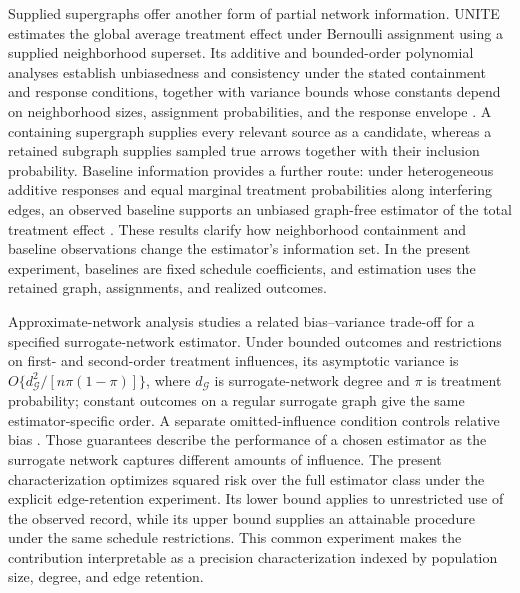 Supplied supergraphs offer another form of partial network information. UNITE estimates the global average treatment effect under Bernoulli assignment using a supplied neighborhood superset. Its additive and bounded-order polynomial analyses establish unbiasedness and consistency under the stated containment and response conditions, together with variance bounds whose constants depend on neighborhood sizes, assignment probabilities, and the response envelope \citep[Theorems 1, 4, and 8; Appendix B.1]{ShankarEtAl2024UNITE}. A containing supergraph supplies every relevant source as a candidate, whereas a retained subgraph supplies sampled true arrows together with their inclusion probability. Baseline information provides a further route: under heterogeneous additive responses and equal marginal treatment probabilities along interfering edges, an observed baseline supports an unbiased graph-free estimator of the total treatment effect \citep[Corollary 3]{YuAiroldiBorgsChayes2022}. These results clarify how neighborhood containment and baseline observations change the estimator's information set. In the present experiment, baselines are fixed schedule coefficients, and estimation uses the retained graph, assignments, and realized outcomes.

Approximate-network analysis studies a related bias--variance trade-off for a specified surrogate-network estimator. Under bounded outcomes and restrictions on first- and second-order treatment influences, its asymptotic variance is \(O\{d_{\mathcal G}^2/[n\pi(1-\pi)]\}\), where \(d_{\mathcal G}\) is surrogate-network degree and \(\pi\) is treatment probability; constant outcomes on a regular surrogate graph give the same estimator-specific order. A separate omitted-influence condition controls relative bias \citep[Assumptions 1--3; Theorems 1--2; Lemma 2]{JiangDengWangWang2024ApproximateNetworks}. Those guarantees describe the performance of a chosen estimator as the surrogate network captures different amounts of influence. The present characterization optimizes squared risk over the full estimator class under the explicit edge-retention experiment. Its lower bound applies to unrestricted use of the observed record, while its upper bound supplies an attainable procedure under the same schedule restrictions. This common experiment makes the contribution interpretable as a precision characterization indexed by population size, degree, and edge retention.
